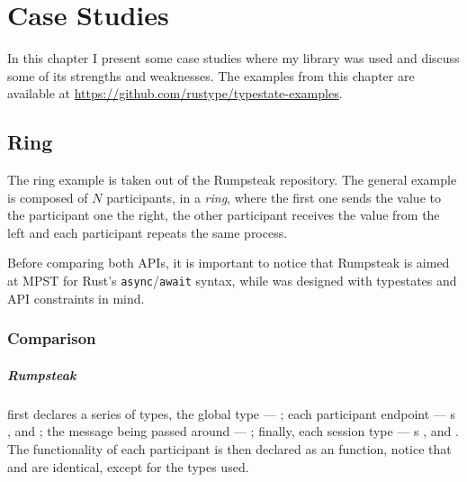 

\chapter{Case Studies}\label{cha:case-study}

In this chapter I present some case studies where my library was used and discuss some of its strengths and weaknesses.
The examples from this chapter are available at \url{https://github.com/rustype/typestate-examples}.

\section{Ring}

The ring example is taken out of the Rumpsteak \autocite{Cutner2021} repository.
The general example is composed of $N$ participants, in a \emph{ring},
where the first one sends the value to the participant one the right,
the other participant receives the value from the left and each participant repeats the same process.


Before comparing both APIs, it is important to notice that Rumpsteak is aimed at \gls{MPST}
for Rust's \texttt{async}/\texttt{await} syntax,
while  was designed with typestates and API constraints in mind.



\subsection{Comparison}

\paragraph{Rumpsteak} first declares a series of types, the global type --- ;
each participant endpoint --- s ,  and ;
the message being passed around --- ;
finally, each session type --- s ,  and .
The functionality of each participant is then declared as an  function,
notice that  and  are identical, except for the types used.

